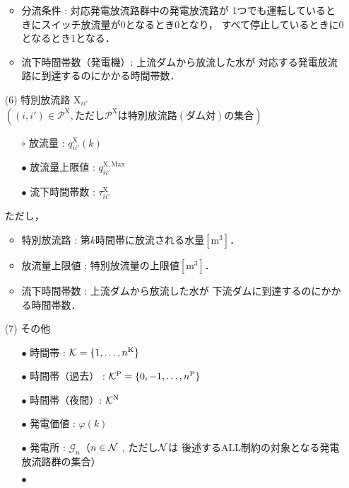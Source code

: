 \begin{itemize}
\begin{itemize}
		\item 分流条件 : 対応発電放流路群中の発電放流路が %
			1つでも運転しているときにスイッチ放流量が0となるとき0となり， %
			すべて停止しているときに0となるとき1となる．
		\item 流下時間帯数（発電機）: 上流ダムから放流した水が%
			対応する発電放流路に到達するのにかかる時間帯数．
	\end{itemize}
%
\item[(6)]
	特別放流路 $ \mathrm{X}_{ii'}$ $ ( (i,i') \in \mathcal{P}^{\mathrm X} , %
	ただし \mathcal {P}^{\mathrm X} は特別放流路(ダム対)の集合) $
%
	\begin{itemize}
		\item[$ \circ$]
			放流量 : $q^{\mathrm {X}}_{ii'}(k)$
		\item[$ \bullet$]
			放流量上限値 : $q^{\mathrm {X,Max}}_{ii'}$
		\item[$ \bullet$]
			流下時間帯数 : $ \tau_{ii'}^{\mathrm X}$
	\end{itemize}
	ただし，
	\begin{itemize}
		\item 特別放流路 : 第$k$時間帯に放流される水量$[\mathrm m^3]$．
		\item 放流量上限値 : 特別放流量の上限値$[\mathrm m^3]$．
		\item 流下時間帯数 : 上流ダムから放流した水が%
			下流ダムに到達するのにかかる時間帯数．
	\end{itemize}
%
\item[(7)]
	その他 
%
	\begin{itemize}
		\item[$\bullet$] 
			時間帯 : $ \mathcal{K} = \{ 1 , \hdots , n^{\rm K} \} $
		\item[$\bullet$]
			時間帯（過去） : $\mathcal{K}^{\rm P} = \{ 0 , -1 , \hdots , n^{\rm P} \} $
		\item[$\bullet$] 
			時間帯（夜間）: $\mathcal {K}^{\rm N}$
		\item[$\bullet$] 
			発電価値 : $\varphi (k)$
		\item[$\bullet$]
			発電所 : $\mathcal{G}_{n}$（$n \in \cal{N}$ , ただし$\cal N$は%
			後述するALL制約の対象となる発電放流路群の集合）
		\item[$\bullet$]

\end{itemize}
\end{itemize}
